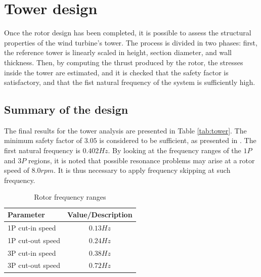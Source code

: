\section{Tower design}

Once the rotor design has been completed, it is possible to assess the structural properties of the wind turbine's tower. The process is divided in two phases: first, the reference tower is linearly scaled in height, section diameter, and wall thickness. Then, by computing the thrust produced by the rotor, the stresses inside the tower are estimated, and it is checked that the safety factor is satisfactory, and that the fist natural frequency of the system is sufficiently high.

\subsection{Summary of the design}

The final results for the tower analysis are presented in Table \ref{tab:tower}. The minimum safety factor of $3.05$ is considered to be sufficient, as presented in \cite{NREL_tower}.
The first natural frequency is $0.402Hz$. By looking at the frequency ranges of the $1P$ and $3P$ regions, it is noted that possible resonance problems may arise at a rotor speed of $8.0 rpm$. It is thus necessary to apply frequency skipping at such frequency.

\begin{table}[H]
\begin{center} 
\caption{Rotor frequency ranges}\label{tab:freq_ranges}
\begin{tabular}{ |l|c| } 
\hline
\textbf{Parameter} & \textbf{Value/Description}  \\ 
\hline
1P cut-in speed & $0.13 Hz$ \\ 
\hline
1P cut-out speed & $0.24 Hz$ \\ 
\hline
3P cut-in speed & $0.38 Hz$ \\ 
\hline
3P cut-out speed & $0.72 Hz$ \\ 
\hline
\end{tabular} \\
\end{center}
\end{table}


